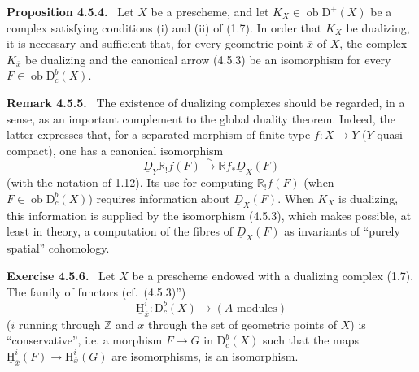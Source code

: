 \documentclass[11pt]{article}
\providecommand{\uH}{\underline{\mathrm H}}
\newenvironment{statement}[1]{\par\medskip\noindent\textbf{#1.}\ }{\par\medskip}
\renewcommand{\H}{\mathrm{H}}
\newcommand{\D}{\mathrm{D}}
\newcommand{\Z}{\mathbb{Z}}
\newcommand{\ob}{\operatorname{ob}}
\newcommand{\ol}[1]{\overline{#1}}
\providecommand{\ob}{\operatorname{ob}}
\providecommand{\Z}{\mathbb Z}
\begin{document}
\begin{statement}{Proposition 4.5.4}
Let $X$ be a prescheme, and let $K_X\in\ob\D^+(X)$ be a complex satisfying conditions (i) and (ii) of (1.7). In order that $K_X$ be dualizing, it is necessary and sufficient that, for every geometric point $\ol{x}$ of $X$, the complex $K_{\ol{x}}$ be dualizing and the canonical arrow (4.5.3) be an isomorphism for every $F\in\ob\D_c^b(X)$.
\end{statement}

\begin{statement}{Remark 4.5.5}
The existence of dualizing complexes should be regarded, in a sense, as an important complement to the global duality theorem. Indeed, the latter expresses that, for a separated morphism of finite type $f:X\to Y$ ($Y$ quasi-compact), one has a canonical isomorphism
\[
\underline{D}_Y\mathbb{R}_!f(F)\xrightarrow{\sim}\mathbb{R} f_*\underline{D}_X(F)
\]
(with the notation of 1.12). Its use for computing $\mathbb{R}_!f(F)$ (when $F\in\ob\D_c^b(X)$) requires information about $\underline{D}_X(F)$. When $K_X$ is dualizing, this information is supplied by the isomorphism (4.5.3), which makes possible, at least in theory, a computation of the fibres of $\underline{D}_X(F)$ as invariants of ``purely spatial'' cohomology.
\end{statement}

\begin{statement}{Exercise 4.5.6}
Let $X$ be a prescheme endowed with a dualizing complex (1.7). The family of functors (cf.~(4.5.3)'')
\[
\underline{\H}_{\ol{x}}^i:\D_c^b(X)\longrightarrow (A\text{-modules})
\]
($i$ running through $\Z$ and $\ol{x}$ through the set of geometric points of $X$) is ``conservative'', i.e. a morphism $F\to G$ in $\D_c^b(X)$ such that the maps $\uH_{\ol{x}}^i(F)\to\H_{\ol{x}}^i(G)$ are isomorphisms, is an isomorphism.
\end{statement}
\end{document}

